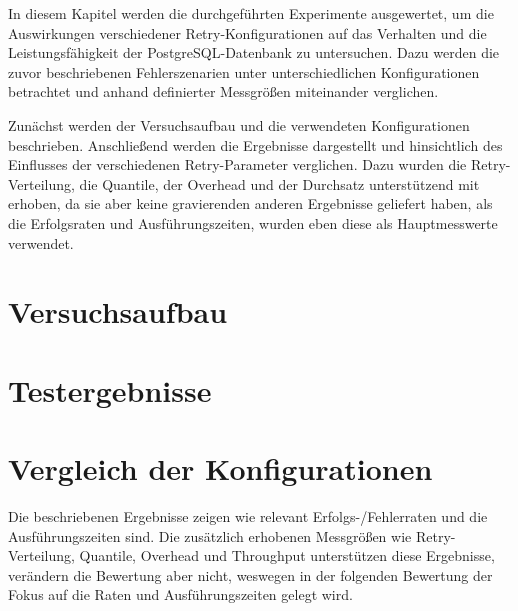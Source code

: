
In diesem Kapitel werden die durchgeführten Experimente ausgewertet, um die Auswirkungen verschiedener
Retry-Konfigurationen auf das Verhalten und die Leistungsfähigkeit der PostgreSQL-Datenbank zu untersuchen.
Dazu werden die zuvor beschriebenen Fehlerszenarien unter unterschiedlichen Konfigurationen betrachtet und anhand
definierter Messgrößen miteinander verglichen.

Zunächst werden der Versuchsaufbau und die verwendeten Konfigurationen beschrieben.
Anschließend werden die Ergebnisse dargestellt und hinsichtlich des Einflusses der verschiedenen Retry-Parameter
verglichen.
Dazu wurden die Retry-Verteilung, die Quantile, der Overhead und der Durchsatz unterstützend mit erhoben, da sie
aber keine gravierenden anderen Ergebnisse geliefert haben, als die Erfolgsraten und Ausführungszeiten, wurden eben
diese als Hauptmesswerte verwendet.

\section{Versuchsaufbau}
\label{sec:experimentSetup}


\section{Testergebnisse}
\label{sec:results}


\section{Vergleich der Konfigurationen}
\label{sec:configComparison}


Die beschriebenen Ergebnisse zeigen wie relevant Erfolgs-/Fehlerraten und die Ausführungszeiten sind.
Die zusätzlich erhobenen Messgrößen wie Retry-Verteilung, Quantile, Overhead und Throughput unterstützen diese
Ergebnisse, verändern die Bewertung aber nicht, weswegen in der folgenden Bewertung der Fokus auf die Raten und
Ausführungszeiten gelegt wird.